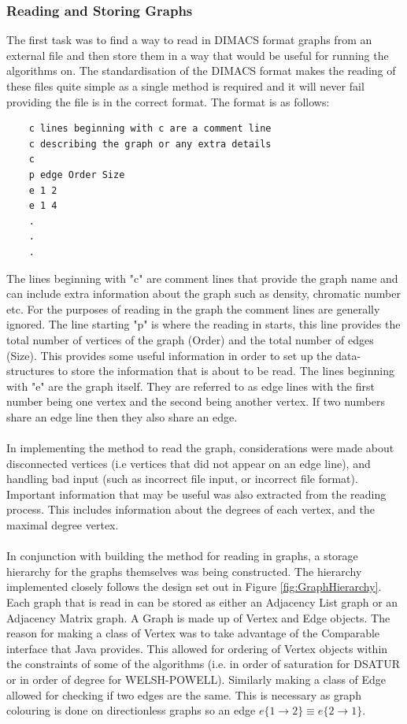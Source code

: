 \subsubsection{Reading and Storing Graphs}
The first task was to find a way to read in DIMACS format graphs from an external file and then store them in a way that would be useful for running the algorithms on. The standardisation of the DIMACS format makes the reading of these files quite simple as a single method is required and it will never fail providing the file is in the correct format. The format is as follows:
\begin{verbatim}
    c lines beginning with c are a comment line 
    c describing the graph or any extra details
    c
    p edge Order Size
    e 1 2
    e 1 4
    .
    .
    .
\end{verbatim}
The lines  beginning with "c" are comment lines that provide the graph name and can include extra information about the graph such as density, chromatic number etc. For the purposes of reading in the graph the comment lines are generally ignored. The line starting "p" is where the reading in starts, this line provides the total number of vertices of the graph (Order) and the total number of edges (Size). This provides some useful information in order to set up the data-structures to store the information that is about to be read. The lines beginning with "e" are the graph itself. They are referred to as edge lines with the first number being one vertex and the second being another vertex. If two numbers share an edge line then they also share an edge. 
\\\\
In implementing the method to read the graph, considerations were made about disconnected vertices (i.e vertices that did not appear on an edge line), and handling bad input (such as incorrect file input, or incorrect file format). Important information that may be useful was also extracted from the reading process. This includes information about the degrees of each vertex, and the maximal degree vertex. 
\\\\
 In conjunction with building the method for reading in graphs, a storage hierarchy for the graphs themselves was being constructed. The hierarchy implemented closely follows the design set out in Figure \ref{fig:GraphHierarchy}. Each graph that is read in can be stored as either an Adjacency List graph or an Adjacency Matrix graph. A Graph is made up of Vertex and Edge objects. The reason for making a class of Vertex was to take advantage of the Comparable interface that Java provides. This allowed for ordering of Vertex objects within the constraints of some of the algorithms (i.e. in order of saturation for DSATUR or in order of degree for WELSH-POWELL). Similarly making a class of Edge allowed for checking if two edges are the same. This is necessary as graph colouring is done on directionless graphs so an edge $e\{1 \rightarrow 2\} \equiv e\{2 \rightarrow 1\}$. 
 

